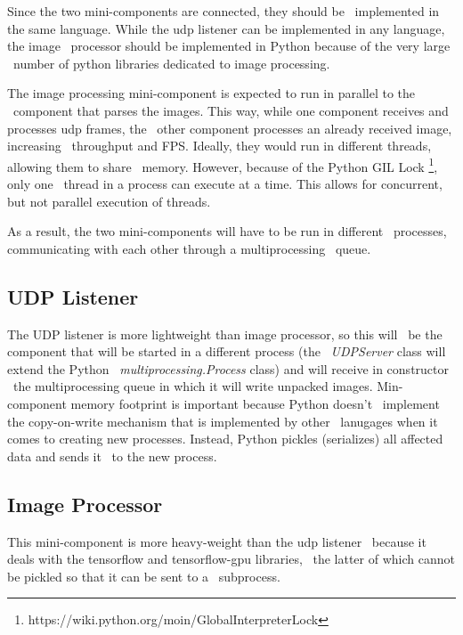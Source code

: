 Since the two mini-components are connected, they should be \
implemented in the same language.
While the udp listener can be implemented in any language, the image \
processor should be implemented in Python because of the very large \
number of python libraries dedicated to image processing.


The image processing mini-component is expected to run in parallel to the \
component that parses the images.
This way, while one component receives and processes udp frames, the \
other component processes an already received image, increasing \
throughput and FPS.
Ideally, they would run in different threads, allowing them to share \
memory.
However, because of the Python GIL Lock
\footnote{https://wiki.python.org/moin/GlobalInterpreterLock}, only one \
thread in a process can execute at a time.
This allows for concurrent, but not parallel execution of threads.

As a result, the two mini-components will have to be run in different \
processes, communicating with each other through a multiprocessing \
queue.


\subsection{UDP Listener}
\label{subsec:implementation-udp-listener}
The UDP listener is more lightweight than image processor, so this will \
be the component that will be started in a different process (the \
\textit{UDPServer} class will extend the Python \
\textit{multiprocessing.Process} class) and will receive in constructor \
the multiprocessing queue in which it will write unpacked images.
Min-component memory footprint is important because Python doesn't \
implement the copy-on-write mechanism that is implemented by other \
lanugages when it comes to creating new processes.
Instead, Python pickles (serializes) all affected data and sends it \
to the new process.

\subsection{Image Processor}
\label{subsec:implementation-image-processor}
This mini-component is more heavy-weight than the udp listener \
because it deals with the tensorflow and tensorflow-gpu libraries, \
the latter of which cannot be pickled so that it can be sent to a \
subprocess.

